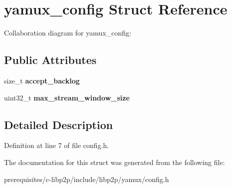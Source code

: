 \hypertarget{structyamux__config}{}\section{yamux\+\_\+config Struct Reference}
\label{structyamux__config}


Collaboration diagram for yamux\+\_\+config\+:
\subsection*{Public Attributes}
\begin{DoxyCompactItemize}
\item 
\mbox{\label{structyamux__config_ab548bd1d3ca7767e45e5dd7511a7704f}} 
size\+\_\+t {\bfseries accept\+\_\+backlog}
\item 
\mbox{\label{structyamux__config_a31846e501edd96c2bc91f6bf42cafa6d}} 
uint32\+\_\+t {\bfseries max\+\_\+stream\+\_\+window\+\_\+size}
\end{DoxyCompactItemize}


\subsection{Detailed Description}


Definition at line 7 of file config.\+h.



The documentation for this struct was generated from the following file\+:\begin{DoxyCompactItemize}
\item 
prerequisites/c-\/libp2p/include/libp2p/yamux/config.\+h\end{DoxyCompactItemize}
